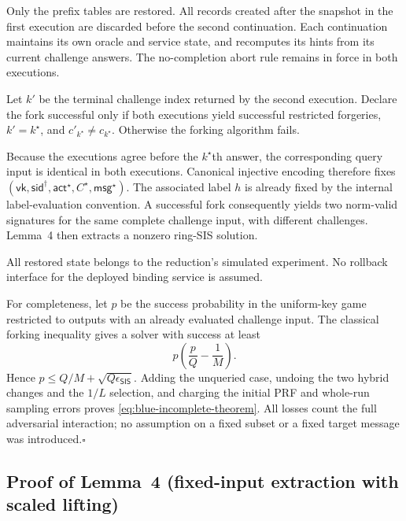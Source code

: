 \documentclass[lettersize,journal]{IEEEtran}
\begin{document}
	Only the prefix tables are restored.
	All records created after the snapshot in the first execution
	are discarded before the second continuation.
	Each continuation maintains its own oracle and service state,
	and recomputes its hints from its current challenge answers.
	The no-completion abort rule remains in force in both executions.
	
	Let $k'$ be the terminal challenge index returned by the second
	execution.
	Declare the fork successful only if both executions yield successful
	restricted forgeries, $k'=k^\star$, and
	$c'_{k^\star}\ne c_{k^\star}$.
	Otherwise the forking algorithm fails.
	
	Because the executions agree before the $k^\star$th answer,
	the corresponding query input is identical in both executions.
	Canonical injective encoding therefore fixes
	$(\mathsf{vk},\mathsf{sid}^{\dagger},
	\mathsf{act}^{\star},C^{\star},\mathsf{msg}^{\star})$.
	The associated label $h$ is already fixed by the internal
	label-evaluation convention.
	A successful fork consequently yields two norm-valid signatures
	for the same complete challenge input, with different challenges.
	Lemma~4 then extracts a nonzero ring-SIS solution.
	
	All restored state belongs to the reduction's simulated experiment.
	No rollback interface for the deployed binding service is assumed.
	
	For completeness, let $p$ be the success probability in the uniform-key
	game restricted to outputs with an already evaluated challenge input.
	The classical forking inequality
	gives a solver with success at least
	\[
	p\left(\frac pQ-\frac1M\right).
	\]
	Hence $p\leq Q/M+\sqrt{Q\epsilon_{\mathsf{SIS}}}$. Adding the unqueried
	case, undoing the two hybrid changes and the $1/L$ selection, and charging
	the initial PRF and whole-run sampling errors proves
	\eqref{eq:blue-incomplete-theorem}. All losses count the full adversarial
	interaction; no assumption on a fixed subset or a fixed target message was
	introduced.\hfill$\square$
	
	\subsection{Proof of Lemma~4 (fixed-input extraction with scaled lifting)}
	\label{app:talon-lemma4-proof}
	
\end{document}
